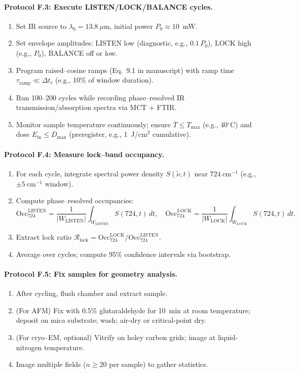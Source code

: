 \documentclass[11pt]{article}
\begin{document}
\paragraph{Protocol F.3: Execute LISTEN/LOCK/BALANCE cycles.}
\begin{enumerate}
\item Set IR source to $\lambda_0=13.8~\mu$m, initial power $P_0\approx 10$~mW.
\item Set envelope amplitudes: \textsf{LISTEN} low (diagnostic, e.g., $0.1\,P_0$), \textsf{LOCK} high (e.g., $P_0$), \textsf{BALANCE} off or low.
\item Program raised–cosine ramps (Eq.~9.1 in manuscript) with ramp time $\tau_{\mathrm{ramp}}\ll \Delta t_\ell$ (e.g., 10\% of window duration).
\item Run 100–200 cycles while recording phase–resolved IR transmission/absorption spectra via MCT + FTIR.
\item Monitor sample temperature continuously; ensure $T\le T_{\max}$ (e.g., 40$^\circ$C) and dose $E_{\mathrm{in}}\le D_{\max}$ (preregister, e.g., 1~J/cm$^2$ cumulative).
\end{enumerate}

\paragraph{Protocol F.4: Measure lock–band occupancy.}
\begin{enumerate}
\item For each cycle, integrate spectral power density $S(\tilde\nu,t)$ near $724~\mathrm{cm^{-1}}$ (e.g., $\pm 5~\mathrm{cm^{-1}}$ window).
\item Compute phase–resolved occupancies:
\[
\mathrm{Occ}_{724}^{\mathrm{LISTEN}}=\frac{1}{|W_{\mathrm{LISTEN}}|}\int_{W_{\mathrm{LISTEN}}}\!\!\!S(724,t)\,dt,\quad
\mathrm{Occ}_{724}^{\mathrm{LOCK}}=\frac{1}{|W_{\mathrm{LOCK}}|}\int_{W_{\mathrm{LOCK}}}\!\!\!S(724,t)\,dt.
\]
\item Extract lock ratio $\mathcal{R}_{\mathrm{lock}}=\mathrm{Occ}_{724}^{\mathrm{LOCK}}/\mathrm{Occ}_{724}^{\mathrm{LISTEN}}$.
\item Average over cycles; compute 95\% confidence intervals via bootstrap.
\end{enumerate}

\paragraph{Protocol F.5: Fix samples for geometry analysis.}
\begin{enumerate}
\item After cycling, flush chamber and extract sample.
\item (For AFM) Fix with 0.5\% glutaraldehyde for 10~min at room temperature; deposit on mica substrate; wash; air-dry or critical-point dry.
\item (For cryo–EM, optional) Vitrify on holey carbon grids; image at liquid-nitrogen temperature.
\item Image multiple fields ($n\ge 20$ per sample) to gather statistics.
\end{enumerate}
\end{document}
